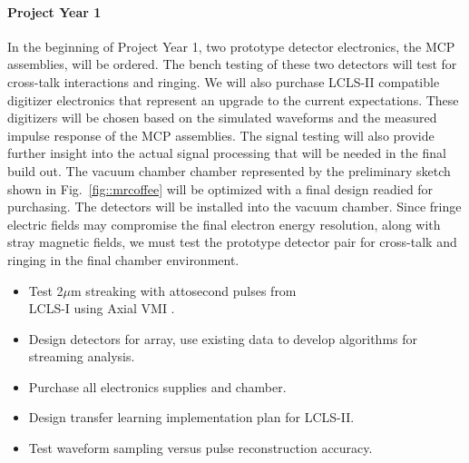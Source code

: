 \paragraph*{Project Year 1}
In the beginning of Project Year 1, two prototype detector electronics, the MCP assemblies, will be ordered.
The bench testing of these two detectors will test for cross-talk interactions and ringing.
We will also purchase LCLS-II compatible digitizer electronics that represent an upgrade to the current expectations.
These digitizers will be chosen based on the simulated waveforms and the measured impulse response of the MCP assemblies.
The signal testing will also provide further insight into the actual signal processing that will be needed in the final build out.  
The vacuum chamber chamber represented by the preliminary sketch shown in Fig.~\ref{fig::mrcoffee} will be optimized with a final design readied for purchasing. 
The detectors will be installed into the vacuum chamber.
Since fringe electric fields may compromise the final electron energy resolution, along with stray magnetic fields, we must test the prototype detector pair for cross-talk and ringing in the final chamber environment.  
\begin{itemize}
\item Test 2$\mu$m streaking with attosecond pulses from \\LCLS-I using Axial VMI \cite{Siqi2018}.
\item Design detectors for array, use existing data to develop algorithms for streaming analysis.
\item Purchase all electronics supplies and chamber.
\item Design transfer learning implementation plan for LCLS-II.
\item Test waveform sampling versus pulse reconstruction accuracy.
\end{itemize}

